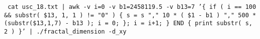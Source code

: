 \documentclass[a4paper]{article}
\begin{document}
\texttt{\small{ cat usc\_18.txt | awk -v i=0 -v b1=2458119.5 -v b13=7 '\{ if ( i == 100 \&\& substr( \$13, 1, 1 ) != "0" ) \{ s = s "," 10 * ( \$1 - b1 ) "," 500 * (substr(\$13,1,7) - b13 ); i = 0; \}; i = i+1; \} END \{ print substr( s, 2 ) \}' | ./fractal\_dimension -d\_xy }}




\end{document}
